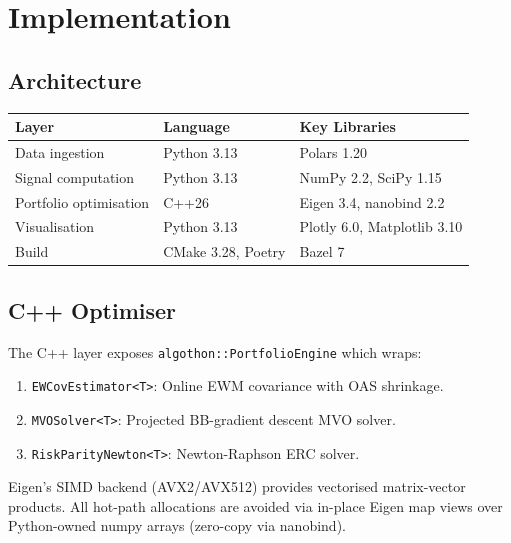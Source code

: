\documentclass[11pt,a4paper]{article}
\begin{document}
\section{Implementation}
\label{sec:impl}

\subsection{Architecture}

\begin{center}
\begin{tabular}{lll}
\toprule
Layer & Language & Key Libraries \\
\midrule
Data ingestion & Python 3.13 & Polars 1.20 \\
Signal computation & Python 3.13 & NumPy 2.2, SciPy 1.15 \\
Portfolio optimisation & C++26 & Eigen 3.4, nanobind 2.2 \\
Visualisation & Python 3.13 & Plotly 6.0, Matplotlib 3.10 \\
Build & CMake 3.28, Poetry & Bazel 7 \\
\bottomrule
\end{tabular}
\end{center}

\subsection{C++ Optimiser}

The C++ layer exposes \texttt{algothon::PortfolioEngine} which wraps:
\begin{enumerate}
  \item \texttt{EWCovEstimator<T>}: Online EWM covariance with OAS shrinkage.
  \item \texttt{MVOSolver<T>}: Projected BB-gradient descent MVO solver.
  \item \texttt{RiskParityNewton<T>}: Newton-Raphson ERC solver.
\end{enumerate}

Eigen's SIMD backend (AVX2/AVX512) provides vectorised matrix-vector products.
All hot-path allocations are avoided via in-place Eigen map views over Python-owned
numpy arrays (zero-copy via nanobind).
\end{document}
